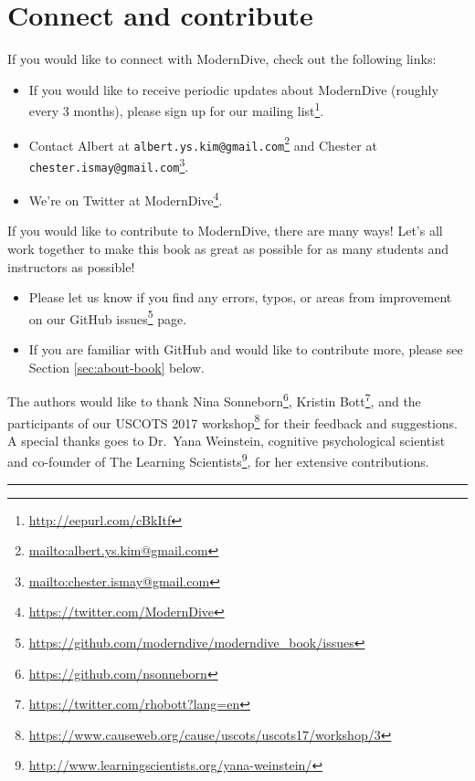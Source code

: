 \documentclass[12pt,]{krantz}
\providecommand{\tightlist}{%
  \setlength{\itemsep}{0pt}\setlength{\parskip}{0pt}}
\renewcommand{\href}[2]{#2\footnote{\url{#1}}}
\theoremstyle{definition}
\theoremstyle{definition}
\theoremstyle{definition}
\theoremstyle{remark}
\begin{document}
\hypertarget{sec:connect-contribute}{\section{Connect and
contribute}\label{sec:connect-contribute}}

If you would like to connect with ModernDive, check out the following
links:

\begin{itemize}
\tightlist
\item
  If you would like to receive periodic updates about ModernDive
  (roughly every 3 months), please sign up for our
  \href{http://eepurl.com/cBkItf}{mailing list}.
\item
  Contact Albert at
  \href{mailto:albert.ys.kim@gmail.com}{\nolinkurl{albert.ys.kim@gmail.com}}
  and Chester at
  \href{mailto:chester.ismay@gmail.com}{\nolinkurl{chester.ismay@gmail.com}}.
\item
  We're on Twitter at \href{https://twitter.com/ModernDive}{ModernDive}.
\end{itemize}

If you would like to contribute to ModernDive, there are many ways!
Let's all work together to make this book as great as possible for as
many students and instructors as possible!

\begin{itemize}
\tightlist
\item
  Please let us know if you find any errors, typos, or areas from
  improvement on our
  \href{https://github.com/moderndive/moderndive_book/issues}{GitHub
  issues} page.
\item
  If you are familiar with GitHub and would like to contribute more,
  please see Section \ref{sec:about-book} below.
\end{itemize}

The authors would like to thank
\href{https://github.com/nsonneborn}{Nina Sonneborn},
\href{https://twitter.com/rhobott?lang=en}{Kristin Bott}, and the
participants of our
\href{https://www.causeweb.org/cause/uscots/uscots17/workshop/3}{USCOTS
2017 workshop} for their feedback and suggestions. A special thanks goes
to Dr.~Yana Weinstein, cognitive psychological scientist and co-founder
of \href{http://www.learningscientists.org/yana-weinstein/}{The Learning
Scientists}, for her extensive contributions.

\begin{center}\rule{0.5\linewidth}{\linethickness}\end{center}
\end{document}
